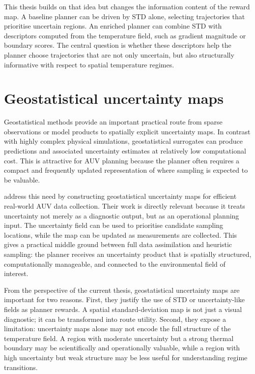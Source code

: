 This thesis builds on that idea but changes the information content of the reward map. A baseline planner can be driven by STD alone, selecting trajectories that prioritise uncertain regions. An enriched planner can combine STD with descriptors computed from the temperature field, such as gradient magnitude or boundary scores. The central question is whether these descriptors help the planner choose trajectories that are not only uncertain, but also structurally informative with respect to spatial temperature regimes.

\section{Geostatistical uncertainty maps}
\label{sec:sota_geostatistical_maps}

Geostatistical methods provide an important practical route from sparse observations or model products to spatially explicit uncertainty maps. In contrast with highly complex physical simulations, geostatistical surrogates can produce predictions and associated uncertainty estimates at relatively low computational cost. This is attractive for AUV planning because the planner often requires a compact and frequently updated representation of where sampling is expected to be valuable.

\textcite{duarte2025geostatistical} address this need by constructing geostatistical uncertainty maps for efficient real-world AUV data collection. Their work is directly relevant because it treats uncertainty not merely as a diagnostic output, but as an operational planning input. The uncertainty field can be used to prioritise candidate sampling locations, while the map can be updated as measurements are collected. This gives a practical middle ground between full data assimilation and heuristic sampling: the planner receives an uncertainty product that is spatially structured, computationally manageable, and connected to the environmental field of interest.

From the perspective of the current thesis, geostatistical uncertainty maps are important for two reasons. First, they justify the use of STD or uncertainty-like fields as planner rewards. A spatial standard-deviation map is not just a visual diagnostic; it can be transformed into route utility. Second, they expose a limitation: uncertainty maps alone may not encode the full structure of the temperature field. A region with moderate uncertainty but a strong thermal boundary may be scientifically and operationally valuable, while a region with high uncertainty but weak structure may be less useful for understanding regime transitions.


